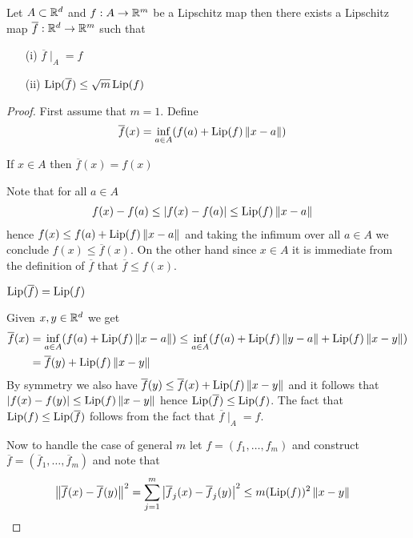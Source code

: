 \begin{lem}\label{ExtensionOfLipschitzMaps}Let $A \subset \mathbb{R}^d$ and $f : A \to \mathbb{R}^m$ be a Lipschitz map then there exists a Lipschitz map $\overline{f} : \mathbb{R}^d \to \mathbb{R}^m$ such that
\begin{itemize}
\item[(i)] $\overline{f} \mid_A = f$
\item[(ii)] $\operatorname*{Lip}(\overline{f}) \leq \sqrt{m} \operatorname*{Lip}(f)$
\end{itemize}
\end{lem}
\begin{proof}
First assume that $m=1$.  Define 
\begin{align*}
\overline{f}(x) &= \inf_{a \in A} (f(a) + \operatorname*{Lip}(f) \left \lVert x - a \right \rVert)
\end{align*}
\begin{clm} If $x \in A$ then $\overline{f}(x) = f(x)$
\end{clm}
Note that for all $a \in A$
\begin{align*}
f(x) - f(a) &\leq \left \vert f(x) - f(a) \right \vert \leq \operatorname*{Lip}(f) \left \lVert x-a \right \rVert
\end{align*}
hence $f(x) \leq f(a) + \operatorname*{Lip}(f) \left \lVert x-a \right \rVert$ and taking the infimum over all $a \in A$ we conclude $f(x) \leq \overline{f}(x)$.  On the other hand since $x \in A$ it is immediate from the definition
of $\overline{f}$ that $\overline{f} \leq f(x)$.

\begin{clm} $\operatorname*{Lip}(\overline{f}) = \operatorname*{Lip}(f)$
\end{clm}
Given $x,y \in \mathbb{R}^d$ we get
\begin{align*}
\overline{f}(x) &= \inf_{a \in A} (f(a) + \operatorname*{Lip}(f) \left \lVert x-a \right \rVert) \leq \inf_{a \in A} (f(a) + \operatorname*{Lip}(f)\left \lVert y-a \right \rVert + \operatorname*{Lip}(f) \left \lVert x-y \right \rVert) \\
&= \overline{f}(y) + \operatorname*{Lip}(f) \left \lVert x-y \right \rVert
\end{align*}
By symmetry we also have $\overline{f}(y) \leq \overline{f}(x) + \operatorname*{Lip}(f) \left \lVert x-y \right \rVert$ and it follows that $\left \vert f(x) -f(y) \right \vert \leq \operatorname*{Lip}(f) \left \lVert x-y \right \rVert$ hence $\operatorname*{Lip}(\overline{f}) \leq \operatorname*{Lip}(f)$.  The fact that $\operatorname*{Lip}(f) \leq \operatorname*{Lip}(\overline{f})$ follows from the fact that $\overline{f} \mid_A = f$.

Now to handle the case of general $m$ let $f = (f_1, \dotsc, f_m)$ and construct $\overline{f} = (\overline{f}_1, \dotsc, \overline{f}_m)$ and note that
\begin{align*}
\left \lVert \overline{f}(x) - \overline{f}(y) \right \rVert^2 &= \sum_{j=1}^m \left \vert \overline{f}_j(x) - \overline{f}_j(y) \right \vert^2 \leq m (\operatorname*{Lip}(f))^2 \left \lVert x-y \right \rVert
\end{align*}
\end{proof}

